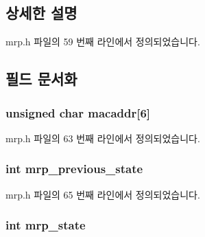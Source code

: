 \subsection{상세한 설명}


mrp.\+h 파일의 59 번째 라인에서 정의되었습니다.



\subsection{필드 문서화}
\subsubsection[{\texorpdfstring{macaddr}{macaddr}}]{\setlength{\rightskip}{0pt plus 5cm}unsigned char macaddr\mbox{[}6\mbox{]}}\hypertarget{structmrp__registrar__attribute_a3c39313f42d97e1a0bdb140add9ff200}{}\label{structmrp__registrar__attribute_a3c39313f42d97e1a0bdb140add9ff200}


mrp.\+h 파일의 63 번째 라인에서 정의되었습니다.

\subsubsection[{\texorpdfstring{mrp\+\_\+previous\+\_\+state}{mrp_previous_state}}]{\setlength{\rightskip}{0pt plus 5cm}int mrp\+\_\+previous\+\_\+state}\hypertarget{structmrp__registrar__attribute_a36519f39fcb22bd3b6b05b51d2bb7fbf}{}\label{structmrp__registrar__attribute_a36519f39fcb22bd3b6b05b51d2bb7fbf}


mrp.\+h 파일의 65 번째 라인에서 정의되었습니다.

\subsubsection[{\texorpdfstring{mrp\+\_\+state}{mrp_state}}]{\setlength{\rightskip}{0pt plus 5cm}int mrp\+\_\+state}\hypertarget{structmrp__registrar__attribute_a81aba50506912ce81758c19f9859445e}{}\label{structmrp__registrar__attribute_a81aba50506912ce81758c19f9859445e}


